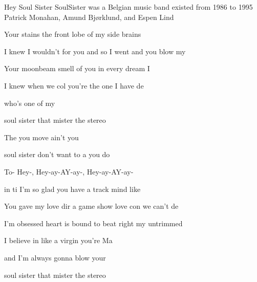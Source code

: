 \begin{SBSong}{Hey Soul Sister}
  {SoulSister was a Belgian music band existed from 1986 to 1995}
  {Patrick Monahan, Amund Bj\o rklund, and Espen Lind}
  \begin{SBVerse}
    Your  stains  the front lobe of my  side brains 

    I knew I wouldn't for you and so I went and  you blow my   

    Your  moonbeam  smell of you in every  dream I 

    I knew when we col you're the one I have de 

    who's one of my   
  \end{SBVerse}
  \begin{SBChorus}
     soul sister  that mister   the  stereo

    The  you move ain't  you 

     soul sister  don't want to  a   you do  

    To- Hey-, Hey-ay-AY-ay-, Hey-ay-AY-ay-
  \end{SBChorus}
  \begin{SBVerse}
     in ti I'm so glad you have a  track mind like 
    
    You gave my love dir a game show love con we can't de  
    
    I'm  obsessed  heart is bound to beat right  my untrimmed 
    
    I believe in  like a virgin you're Ma 

    and I'm always gonna  blow your  
  \end{SBVerse}
  \begin{SBChorus}
     soul sister  that mister   the  stereo
    

\end{SBChorus}
\end{SBSong}

